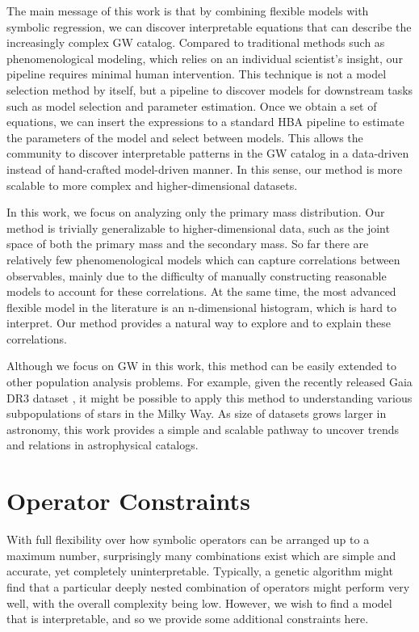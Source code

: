 \documentclass[nohyperref]{article}
\theoremstyle{plain}
\theoremstyle{definition}
\theoremstyle{remark}
\begin{document}
The main message of this work is that by combining flexible models with symbolic regression, we can discover interpretable equations that can describe the increasingly complex GW catalog.
Compared to traditional methods such as phenomenological modeling, which relies on an individual scientist's insight,
our pipeline requires minimal human intervention.
 This technique is not a model selection method by itself, but a pipeline to discover models for downstream tasks such as model selection and parameter estimation.
Once we obtain a set of equations, we can insert the expressions to a standard HBA pipeline to estimate the parameters of the model and select between models.
This allows the community to discover interpretable patterns in the GW catalog in a data-driven instead of hand-crafted model-driven manner.
In this sense, our method is more scalable to more complex and higher-dimensional datasets.

In this work, we focus on analyzing only the primary mass distribution.
Our method is trivially generalizable to higher-dimensional data, such as the joint space of both the primary mass and the secondary mass.
So far there are relatively few phenomenological models which can capture correlations between observables,
mainly due to the difficulty of manually constructing reasonable models to account for these correlations.
At the same time, the most advanced flexible model in the literature is an n-dimensional histogram, which is hard to interpret.
Our method provides a natural way to explore and to explain these correlations.

Although we focus on GW in this work, this method can be easily extended to other population analysis problems.
For example, given the recently released Gaia DR3 dataset \cite{Collaboration2016TheGM}, it might be possible to apply this method to understanding various subpopulations of  stars in the Milky Way.
As size of datasets grows larger in astronomy, this work provides a simple and scalable pathway to uncover trends and relations in astrophysical catalogs.





\clearpage
\appendix
\section{Operator Constraints}
\label{sec:constraints}

With full flexibility over how symbolic operators can be arranged up to a maximum number, surprisingly many combinations exist which are simple and accurate, yet completely uninterpretable.
Typically, a genetic algorithm might find that a particular deeply nested combination of operators might perform very well, with the overall complexity being low.
However, we wish to find a model that is interpretable, and so we provide some additional constraints here.
\end{document}
